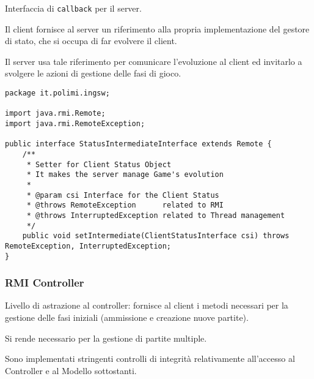 \documentclass[a4paper,11pt]{article} %
\begin{document}
    Interfaccia di \texttt{callback} per il server.

    Il client fornisce al server un riferimento alla propria implementazione del gestore di stato, che si occupa di far evolvere il client.

    Il server usa tale riferimento per comunicare l'evoluzione al client ed invitarlo a svolgere le azioni di gestione delle fasi di gioco.

    \begin{verbatim}
package it.polimi.ingsw;

import java.rmi.Remote;
import java.rmi.RemoteException;

public interface StatusIntermediateInterface extends Remote {
    /**
     * Setter for Client Status Object
     * It makes the server manage Game's evolution
     *
     * @param csi Interface for the Client Status
     * @throws RemoteException      related to RMI
     * @throws InterruptedException related to Thread management
     */
    public void setIntermediate(ClientStatusInterface csi) throws RemoteException, InterruptedException;
}
    \end{verbatim}

    \newpage

    \subsubsection{RMI Controller}
    Livello di astrazione al controller: fornisce al client i metodi necessari per la gestione delle fasi iniziali (ammissione e creazione nuove partite).

    Si rende necessario per la gestione di partite multiple.

    Sono implementati stringenti controlli di integrità relativamente all'accesso al Controller e al Modello sottostanti.
\end{document}
